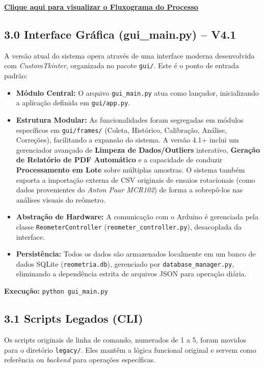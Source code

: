 \documentclass[a4paper,12pt]{article}
\begin{document}
\noindent
\href{https://www.mermaidchart.com/d/6f9e496c-626c-429a-ba93-17c761bf78d0}{\textbf{Clique aqui para visualizar o Fluxograma do Processo}}

\subsection*{3.0 Interface Gráfica (gui\_main.py) -- V4.1}
A versão atual do sistema opera através de uma interface moderna desenvolvida com \textit{CustomTkinter}, organizada no pacote \texttt{gui/}. Este é o ponto de entrada padrão:

\begin{itemize}
  \item \textbf{Módulo Central:} O arquivo \texttt{gui\_main.py} atua como lançador, inicializando a aplicação definida em \texttt{gui/app.py}.
  \item \textbf{Estrutura Modular:} As funcionalidades foram segregadas em módulos específicos em \texttt{gui/frames/} (Coleta, Histórico, Calibração, Análise, Correções), facilitando a expansão do sistema. A versão 4.1+ inclui um gerenciador avançado de \textbf{Limpeza de Dados/Outliers} interativo, \textbf{Geração de Relatório de PDF Automático} e a capacidade de conduzir \textbf{Processamento em Lote} sobre múltiplas amostras. O sistema também suporta a importação externa de CSV originais de ensaios rotacionais (como dados provenientes do \textit{Anton Paar MCR102}) de forma a sobrepô-los nas análises visuais do reômetro. 
  \item \textbf{Abstração de Hardware:} A comunicação com o Arduino é gerenciada pela classe \texttt{ReometerController} (\texttt{reometer\_controller.py}), desacoplada da interface.
  \item \textbf{Persistência:} Todos os dados são armazenados localmente em um banco de dados SQLite (\texttt{reometria.db}), gerenciado por \texttt{database\_manager.py}, eliminando a dependência estrita de arquivos JSON para operação diária.
\end{itemize}

\textbf{Execução:} \texttt{python gui\_main.py}

\subsection*{3.1 Scripts Legados (CLI)}
Os scripts originais de linha de comando, numerados de 1 a 5, foram movidos para o diretório \texttt{legacy/}. Eles mantêm a lógica funcional original e servem como referência ou \textit{backend} para operações específicas.
\end{document}
